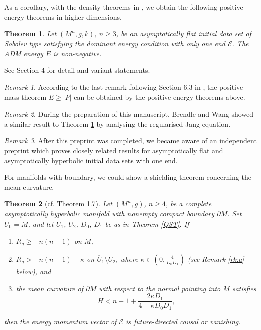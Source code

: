 \documentclass[11pt]{amsart}
\newtheorem{thm}{Theorem}[section]
\theoremstyle{remark}
\newtheorem{rem}{Remark}[section]
\numberwithin{equation}{section}
\begin{document}
{{As a corollary,  with the density theorems in \cite{EHLS}, we obtain the following positive energy theorems in higher dimensions.   
\begin{thm} \label{PET1} 
Let $(M^n,g, k)$, $n \ge 3$, be an asymptotically flat initial data set of Sobolev type satisfying the dominant energy condition with only one end $\mathcal E$. 
The ADM energy $E$ is non-negative.  
\end{thm}

See Section 4 for detail and variant statements. 

\begin{rem}
According to the last remark following Section 6.3 in \cite{EHLS}, the positive mass theorem $E\geq|P|$ can be obtained by the positive energy theorems above. 
\end{rem}

\begin{rem}
During the preparation of this manuscript, Brendle and Wang \cite{BW2} showed a similar result to Theorem \ref{PET1} by analysing the regularised Jang equation. 
\end{rem} 

\begin{rem}
After this preprint was completed, we became aware of an independent preprint \cite{HKLZ} which proves closely related results for asymptotically flat and asymptotically hyperbolic initial data sets with one end.  
\end{rem}

For manifolds with boundary, we could show a shielding theorem concerning the mean curvature. 
\begin{thm}[cf. \cite{LLU22} Theorem 1.7]\label{CZ2}
Let $(M^n,g)$, $n\ge 4$, be a complete asymptotically hyperbolic manifold with nonempty compact boundary $\partial M$. Set $U_0=M$, and let $U_1$, $U_2$, $D_0$, $D_1$ be as in Theorem \ref{QST}. 
If
\begin{enumerate}
    \item $R_g\ge -n(n-1)$ on $M$, 
    \item \label{CZ2a} $R_g>-n(n-1)+ \kappa$ on $\overline U_1\setminus U_2$, where $\kappa \in (0, \frac{4}{D_0 D_1})$ (see Remark \ref{rk:a} below), and
    \item \label{CZ2c} the mean curvature of $\partial M$ with respect to the normal pointing into $M$ satisfies
\begin{equation}\label{Hineq}
H<n-1+\frac{2\kappa D_1}{4-\kappa D_0 D_1}, \end{equation}
\end{enumerate} 
then the energy momentum vector of $\mathcal E$ is future-directed causal or vanishing.
\end{thm}


}}
\end{document}

